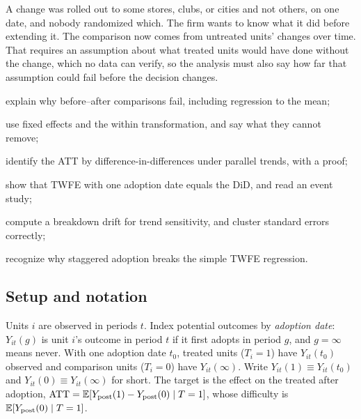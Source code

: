 \documentclass[11pt]{article}
\begin{document}

\begin{decision}
A change was rolled out to some stores, clubs, or cities and not others, on one date, and nobody randomized which. The firm wants
to know what it did before extending it. The comparison now comes from untreated units' changes over time. That requires an
assumption about what treated units would have done without the change, which no data can verify, so the analysis must also say
how far that assumption could fail before the decision changes.
\end{decision}

\begin{goals}
  \item explain why before--after comparisons fail, including regression to the mean;
  \item use fixed effects and the within transformation, and say what they cannot remove;
  \item identify the ATT by difference-in-differences under parallel trends, with a proof;
  \item show that TWFE with one adoption date equals the DiD, and read an event study;
  \item compute a breakdown drift for trend sensitivity, and cluster standard errors correctly;
  \item recognize why staggered adoption breaks the simple TWFE regression.
\end{goals}

\sectionone

\subsection{Setup and notation}

Units $i$ are observed in periods $t$. Index potential outcomes by \emph{adoption date}: $Y_{it}(g)$ is unit $i$'s outcome in period $t$
if it first adopts in period $g$, and $g = \infty$ means never. With one adoption date $t_0$, treated units ($T_i = 1$) have
$Y_{it}(t_0)$ observed and comparison units ($T_i = 0$) have $Y_{it}(\infty)$. Write $Y_{it}(1) \equiv Y_{it}(t_0)$ and
$Y_{it}(0) \equiv Y_{it}(\infty)$ for short. The target is the effect on the treated after adoption,
$\text{ATT} = \mathbb{E}[Y_{\text{post}}(1) - Y_{\text{post}}(0) \mid T = 1]$, whose difficulty is $\mathbb{E}[Y_{\text{post}}(0) \mid T = 1]$.
\end{document}

